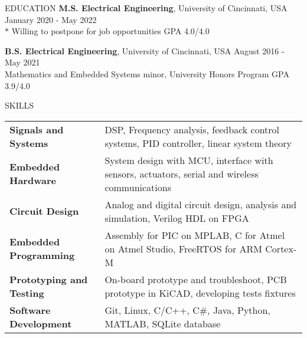 \documentclass{../lib/resume} %
\begin{document}

    \begin{rSection}{EDUCATION}
        {\bf M.S. Electrical Engineering}, University of Cincinnati, USA \hfill {January 2020 - May 2022} \\
        $*$ Willing to postpone for job opportunities \hfill GPA 4.0/4.0 \smallskip

        {\bf B.S. Electrical Engineering}, University of Cincinnati, USA \hfill {August 2016 - May 2021}\\
        Mathematics and Embedded Systems minor, University Honors Program \hfill {GPA 3.9/4.0}




    \end{rSection}

    \begin{rSection}{SKILLS}

        \begin{tabular}{ @{} >{\bfseries}l @{\hspace{2ex}} l }
            Signals and Systems & DSP, Frequency analysis, feedback control systems, PID controller, linear system theory	\\
            Embedded Hardware & System design with MCU, interface with sensors, actuators, serial and wireless communications \\
            Circuit Design & Analog and digital circuit design, analysis and simulation, Verilog HDL on FPGA \\
            Embedded Programming & Assembly for PIC on MPLAB, C for Atmel on Atmel Studio, FreeRTOS for ARM Cortex-M \\
            Prototyping and Testing &  On-board prototype and troubleshoot, PCB prototype in KiCAD, developing tests fixtures \\
            Software Development & Git, Linux, C/C++, C\#, Java, Python, MATLAB, SQLite database \\
        \end{tabular}
    \end{rSection}
\end{document}
